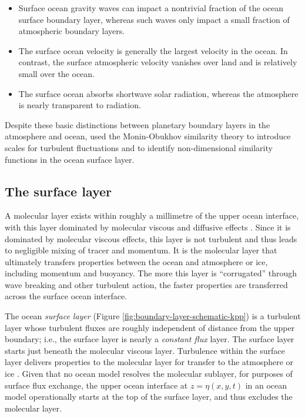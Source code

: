 \begin{itemize}

\item Surface ocean gravity waves can impact a nontrivial fraction of
  the ocean surface boundary layer, whereas such waves only impact a
  small fraction of atmospheric boundary layers.

\item The surface ocean velocity is generally the largest velocity in
  the ocean. In contrast, the surface atmospheric velocity vanishes
  over land and is relatively small over the ocean.

\item The surface ocean absorbs shortwave solar radiation, whereas the
  atmosphere is nearly transparent to radiation.

\end{itemize}
Despite these basic distinctions between planetary boundary layers in
the atmosphere and ocean, \cite{LargeKPP} used the Monin-Obukhov
similarity theory to introduce scales for turbulent fluctuations and
to identify non-dimensional similarity functions in the ocean surface
layer.


\subsection{The surface layer}
\label{subsection:surface-layer}


A molecular layer exists within roughly a millimetre of the upper
ocean interface, with this layer dominated by molecular viscous and
diffusive effects \citep{LargeKPP_lectures,Large2012}.  Since it is
dominated by molecular viscous effects, this layer is not turbulent
and thus leads to negligible mixing of tracer and momentum.  It is the
molecular layer that ultimately transfers properties between the ocean
and atmosphere or ice, including momentum and buoyancy.  The more this
layer is ``corrugated'' through wave breaking and other turbulent
action, the faster properties are transferred across the surface ocean
interface.

The ocean {\it surface layer} (Figure
\ref{fig:boundary-layer-schematic-kpp}) is a turbulent layer whose
turbulent fluxes are roughly independent of distance from the upper
boundary; i.e., the surface layer is nearly a {\it constant flux}
layer.  The surface layer starts just beneath the molecular viscous
layer.  Turbulence within the surface layer delivers properties to the
molecular layer for transfer to the atmosphere or ice
\citep{Fairall_etal1996}.  Given that no ocean model resolves the
molecular sublayer, for purposes of surface flux exchange, the upper
ocean interface at $z=\eta(x,y,t)$ in an ocean model operationally
starts at the top of the surface layer, and thus excludes the
molecular layer.


